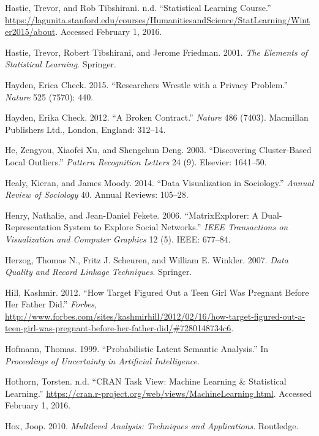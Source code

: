 \documentclass[]{krantz}
\begin{document}
\hypertarget{ref-SLcourse}{}
Hastie, Trevor, and Rob Tibshirani. n.d. ``Statistical Learning
Course.''
\url{https://lagunita.stanford.edu/courses/HumanitiesandScience/StatLearning/Winter2015/about}.
Accessed February 1, 2016.

\hypertarget{ref-HastieTibshirani}{}
Hastie, Trevor, Robert Tibshirani, and Jerome Friedman. 2001. \emph{The
Elements of Statistical Learning}. Springer.

\hypertarget{ref-check2015researchers}{}
Hayden, Erica Check. 2015. ``Researchers Wrestle with a Privacy
Problem.'' \emph{Nature} 525 (7570): 440.

\hypertarget{ref-hayden2012broken}{}
Hayden, Erika Check. 2012. ``A Broken Contract.'' \emph{Nature} 486
(7403). Macmillan Publishers Ltd., London, England: 312--14.

\hypertarget{ref-he2003discovering}{}
He, Zengyou, Xiaofei Xu, and Shengchun Deng. 2003. ``Discovering
Cluster-Based Local Outliers.'' \emph{Pattern Recognition Letters} 24
(9). Elsevier: 1641--50.

\hypertarget{ref-healy2014data}{}
Healy, Kieran, and James Moody. 2014. ``Data Visualization in
Sociology.'' \emph{Annual Review of Sociology} 40. Annual Reviews:
105--28.

\hypertarget{ref-henry2006matrixexplorer}{}
Henry, Nathalie, and Jean-Daniel Fekete. 2006. ``MatrixExplorer: A
Dual-Representation System to Explore Social Networks.'' \emph{IEEE
Transactions on Visualization and Computer Graphics} 12 (5). IEEE:
677--84.

\hypertarget{ref-herzog2007data}{}
Herzog, Thomas N., Fritz J. Scheuren, and William E. Winkler. 2007.
\emph{Data Quality and Record Linkage Techniques}. Springer.

\hypertarget{ref-hill2012target}{}
Hill, Kashmir. 2012. ``How Target Figured Out a Teen Girl Was Pregnant
Before Her Father Did.'' \emph{Forbes},
\url{http://www.forbes.com/sites/kashmirhill/2012/02/16/how-target-figured-out-a-teen-girl-was-pregnant-before-her-father-did/\#7280148734c6}.

\hypertarget{ref-hofmann-99}{}
Hofmann, Thomas. 1999. ``Probabilistic Latent Semantic Analysis.'' In
\emph{Proceedings of Uncertainty in Artificial Intelligence}.

\hypertarget{ref-cranML}{}
Hothorn, Torsten. n.d. ``CRAN Task View: Machine Learning \& Statistical
Learning.''
\url{https://cran.r-project.org/web/views/MachineLearning.html}.
Accessed February 1, 2016.

\hypertarget{ref-hox2010multilevel}{}
Hox, Joop. 2010. \emph{Multilevel Analysis: Techniques and
Applications}. Routledge.
\end{document}
